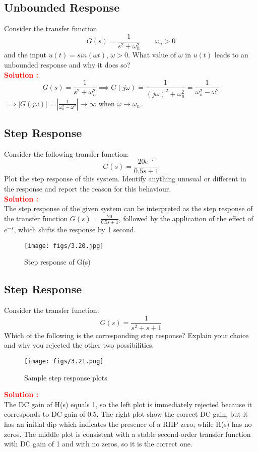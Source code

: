 \documentclass[12pt]{article}
\begin{document}
\clearpage
\subsection{Unbounded Response}
Consider the transfer function
\[
G(s)=\frac{1}{s^2+\omega_n^2} \qquad \omega_n >0
\]
and the input $u(t) = sin(\omega t)$,  $\omega>0$. What value of $\omega$ in $u(t)$ leads to an unbounded response and why it does so? \\

\textbf{\textcolor{red}{Solution :}} \\
\[
G(s)=\frac{1}{s^2+\omega_n^2} \implies G(j \omega) =\frac{1}{(j \omega)^2 +\omega_n^2}  =\frac{1}{\omega_n^2 - \omega^2}
\]
$\implies |G(j \omega)| =\left| \frac{1}{\omega_n^2 - \omega^2}\right| \rightarrow \infty$ when $\omega \rightarrow \omega_n$.

\clearpage
\subsection{Step Response}
Consider the following transfer function:
\[
G(s)=\frac{20 e^{-s}}{0.5s+1}
\]
Plot the step response of this system. Identify anything unusual or different in the response and report the reason for this behaviour. \\ 
\noindent 
\textbf{\textcolor{red}{Solution :}} \\
The step response of the given system can be interpreted as the step response of the transfer function \(G(s) = \frac{20}{0.5s+1}\), followed by the application of the effect of \(e^{-s}\), which shifts the response by 1 second.

\begin{figure}[h!]
    \centering
    \texttt{[image: figs/3.20.jpg]}
    \caption{Step response of G(s)}
    \label{fig:prb45}
\end{figure}

\clearpage
\subsection{Step Response}

Consider the transfer function:
\[
G(s)=\frac{1}{s^2+s+1}
\]
Which of the following is the corresponding step response? Explain your choice and why you rejected the other two possibilities.

\begin{figure}[h!]
    \centering
    \texttt{[image: figs/3.21.png]}
    \caption{Sample step response plots}
    \label{fig:prb50}
\end{figure}
\textbf{\textcolor{red}{Solution :}} \\
The DC gain of H(s) equals 1, so the left plot is immediately rejected because it corresponds to DC gain of 0.5. The right plot show the correct DC gain, but it has an initial dip which indicates the presence of a RHP zero, while H(s) has no zeros. The middle plot is consistent with a stable second-order transfer function with DC gain of 1 and with no zeros, so it is the correct one.
\end{document}
